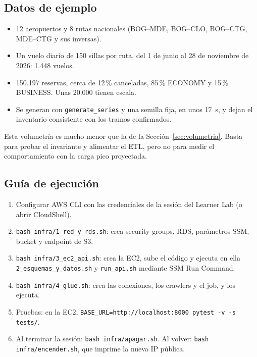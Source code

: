 \documentclass[10pt,letterpaper]{article}
\begin{document}
\subsection{Datos de ejemplo}
\begin{itemize}
  \item 12 aeropuertos y 8 rutas nacionales (BOG--MDE, BOG--CLO, BOG--CTG, MDE--CTG y sus inversas).
  \item Un vuelo diario de 150 sillas por ruta, del 1 de junio al 28 de noviembre de 2026: 1.448 vuelos.
  \item 150.197 reservas, cerca de 12\,\% canceladas, 85\,\% ECONOMY y 15\,\% BUSINESS. Unas 20.000 tienen escala.
  \item Se generan con \texttt{generate\_series} y una semilla fija, en unos 17~s, y dejan el inventario consistente con los tramos confirmados.
\end{itemize}

Esta volumetría es mucho menor que la de la Sección~\ref{sec:volumetria}. Basta para probar el invariante y alimentar el ETL, pero no para medir el comportamiento con la carga pico proyectada.

\subsection{Guía de ejecución}
\begin{enumerate}
  \item Configurar AWS CLI con las credenciales de la sesión del Learner Lab (o abrir CloudShell).
  \item \texttt{bash infra/1\_red\_y\_rds.sh}: crea security groups, RDS, parámetros SSM, bucket y endpoint de S3.
  \item \texttt{bash infra/3\_ec2\_api.sh}: crea la EC2, sube el código y ejecuta en ella \texttt{2\_esquemas\_y\_datos.sh} y \texttt{run\_api.sh} mediante SSM Run Command.
  \item \texttt{bash infra/4\_glue.sh}: crea las conexiones, los crawlers y el job, y los ejecuta.
  \item Pruebas: en la EC2, \texttt{BASE\_URL=http://localhost:8000 pytest -v -s tests/}.
  \item Al terminar la sesión: \texttt{bash infra/apagar.sh}. Al volver: \texttt{bash infra/encender.sh}, que imprime la nueva IP pública.
\end{enumerate}
\end{document}
